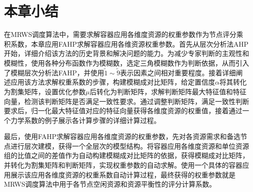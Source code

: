 \section{本章小结}
在MRWS调度算法中，需要求解容器应用各维度资源的权重参数作为节点评分乘积系数，本章应用FAHP求解容器应用各维资源权重参数。首先从层次分析法AHP开始，详细介绍该方法的历史背景和解决问题的能力。为减少专家判断的主观性和模糊性，使用各种分布函数作为模糊数，选定三角模糊数作为判断依据，从而引入了模糊层次分析法FAHP，并使用$\widetilde{1}\sim\widetilde{9}$表示因素之间相对重要程度。接着详细阐述应用该方法求解权重系数的步骤，构建模糊成对比矩阵，给定置信度$\alpha$将其转化为割集矩阵，设置优化参数$\mu$后转化为判断矩阵，求解判断矩阵最大特征值和特征向量，检测该判断矩阵是否满足一致性要求。通过调整判断矩阵，满足一致性判断要求后，归一化最大特征值对应的特征向量获得各维度资源的权重值，接着通过一个力学系数的例子展示各计算步骤的详细计算过程。

最后，使用FAHP求解容器应用各维度资源的权重参数，先对各资源需求和备选节点进行层次建模，获得一个全层次的模型结构。将容器应用各维度资源和单位资源组的比值之间的差值作为自动构建模糊成对比矩阵的依据，获得模糊成对比矩阵，并转化为割集矩阵和判断矩阵，实现权重参数的自动求解。使用一个具体的容器应用展示该应用各维度资源的权重系数自动计算过程，最终获得的权重参数就是MRWS调度算法中用于各节点空闲资源和资源平衡性的评分计算系数。








